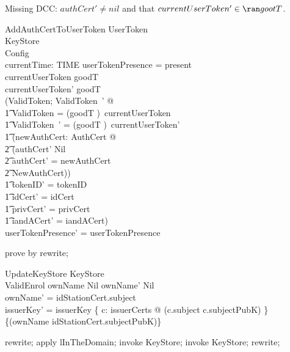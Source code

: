 Missing DCC: $authCert' \neq nil$ and that $currentUserToken' \in \ran gootT$.
\begin{schema}{AddAuthCertToUserToken}
  \Delta UserToken\\
  KeyStore\\
  Config\\
  currentTime: TIME
\where
  userTokenPresence = present\\
  currentUserToken \in  \ran  goodT\\
  currentUserToken' \in \ran goodT \\
  (\exists  ValidToken; ValidToken~' @ \\
  	\t1 \theta  ValidToken   = (goodT \inv)~currentUserToken \land \\
  	\t1 \theta  ValidToken~' = (goodT \inv)~currentUserToken' \land \\
  	\t1 (\exists  newAuthCert: AuthCert @ \\
  		\t2 (authCert' \neq Nil \land \\
  		\t2  \The authCert' = newAuthCert \land \\
  		\t2  NewAuthCert)) \land \\
  	\t1 tokenID' = tokenID \land \\
  	\t1 idCert' = idCert \land \\
  	\t1 privCert' = privCert \land \\
  	\t1 iandACert' = iandACert)\\
  userTokenPresence' = userTokenPresence
\end{schema}

\begin{zproof}
   prove by rewrite;
\end{zproof}

\begin{schema}{UpdateKeyStore}
  \Delta KeyStore\\
  ValidEnrol
\where
  ownName \neq Nil \land ownName' \neq Nil \\
  \The ownName' = idStationCert.subject\\
  issuerKey' = issuerKey \oplus  \{  c: issuerCerts @ (c.subject \mapsto  c.subjectPubK) \} \oplus  \{(\The ownName \mapsto  idStationCert.subjectPubK)\}
\end{schema}

\begin{zproof}
rewrite;
apply lInTheDomain;
invoke \Delta KeyStore;
invoke KeyStore;
rewrite;
\end{zproof}

